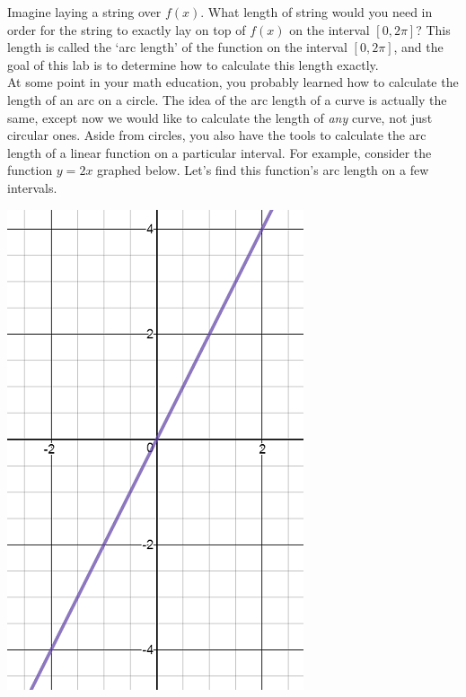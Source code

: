 \documentclass[handout,nooutcomes]{ximera}
\begin{document}
Imagine laying a string over $f(x)$.  What length of string would you need in order for the string to exactly lay on top of $f(x)$ on the interval $[0, 2\pi]$?  This length is called the `arc length' of the function on the interval $[0, 2\pi]$, and the goal of this lab is to determine how to calculate this length exactly.  \\

At some point in your math education, you probably learned how to calculate the length of an arc on a circle.  The idea of the arc length of a curve is actually the same, except now we would like to calculate the length of \textit{any} curve, not just circular ones.  Aside from circles, you also have the tools to calculate the arc length of a linear function on a particular interval.  For example, consider the function $y = 2x$ graphed below.  Let's find this function's arc length on a few intervals.

\begin{center} \includegraphics{2x.png} \end{center}
\end{document}
